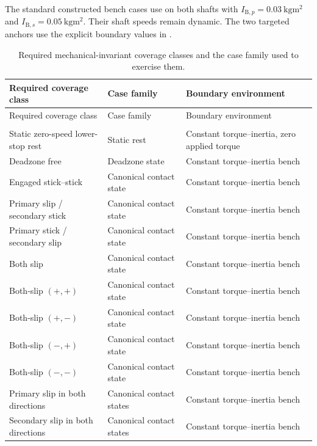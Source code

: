 \documentclass[11pt]{report}
\numberwithin{equation}{section}
\begin{document}
The standard constructed bench cases use
 on both shafts with
$ I_{\mathrm{B},p}=\SI{0.03}{\kilogram\meter\squared}$ and
$ I_{\mathrm{B},s}=\SI{0.05}{\kilogram\meter\squared}$. Their shaft
speeds remain dynamic. The two targeted anchors use the explicit boundary
values in .

\begin{center}
\small
\setlength{\LTleft}{0pt}
\setlength{\LTright}{0pt}
\begin{longtable}{@{}>{\raggedright\arraybackslash}p{}>{\raggedright\arraybackslash}p{}>{\raggedright\arraybackslash}p{}@{}}
\toprule
Required coverage class & Case family & Boundary environment \\ \midrule
\endfirsthead
\toprule
Required coverage class & Case family & Boundary environment \\ \midrule
\endhead
\bottomrule
\endfoot
\bottomrule
\caption{Required mechanical-invariant coverage classes and the case family used to exercise them.}
\label{tab:invariants_coverage_classes}\\
\endlastfoot
Static zero-speed lower-stop rest & Static rest & Constant torque--inertia, zero applied torque \\
Deadzone free & Deadzone state & Constant torque--inertia bench \\
Engaged stick--stick & Canonical contact state & Constant torque--inertia bench \\
Primary slip / secondary stick & Canonical contact state & Constant torque--inertia bench \\
Primary stick / secondary slip & Canonical contact state & Constant torque--inertia bench \\
Both slip & Canonical contact state & Constant torque--inertia bench \\
Both-slip \((+,+)\) & Canonical contact state & Constant torque--inertia bench \\
Both-slip \((+,-)\) & Canonical contact state & Constant torque--inertia bench \\
Both-slip \((-,+)\) & Canonical contact state & Constant torque--inertia bench \\
Both-slip \((-,-)\) & Canonical contact state & Constant torque--inertia bench \\
Primary slip in both directions & Canonical contact states & Constant torque--inertia bench \\
Secondary slip in both directions & Canonical contact states & Constant torque--inertia bench \\

\end{longtable}
\end{center}
\end{document}
